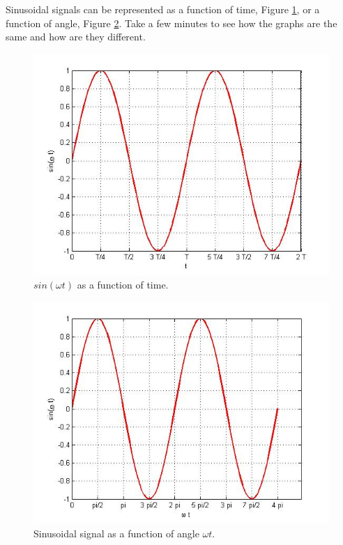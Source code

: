 \documentclass{ximera}
\begin{document}
\begin{definition}
Sinusoidal signals can be represented as a function of time, Figure \ref{sin}, or a function of angle, Figure \ref{sinPh}. Take a few minutes to see how the graphs are the same and how are they different.



\begin{figure}[htpb]
\includegraphics[scale=0.4]{../jpg/cpef1.jpg}
\caption{$sin ( \omega t)$ as a function of time.} \label{sin}
\end{figure}




\begin{figure}[htpb]
\includegraphics[scale=0.4]{../jpg/cpef3.jpg}
\caption{Sinusoidal signal as a function of angle $\omega t$.}
\label{sinPh}
\end{figure}

\end{definition}
\end{document}

